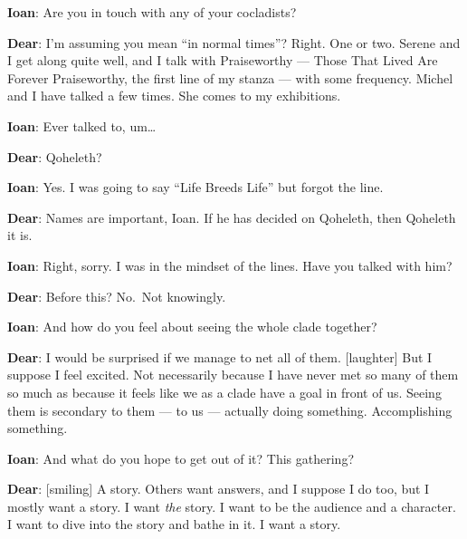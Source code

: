 \textbf{Ioan}: Are you in touch with any of your cocladists?

\textbf{Dear}: I'm assuming you mean ``in normal times''? Right. One or two. Serene and I get along quite well, and I talk with Praiseworthy — Those That Lived Are Forever Praiseworthy, the first line of my stanza — with some frequency. Michel and I have talked a few times. She comes to my exhibitions.

\textbf{Ioan}: Ever talked to, um\ldots{}

\textbf{Dear}: Qoheleth?

\textbf{Ioan}: Yes. I was going to say ``Life Breeds Life'' but forgot the line.

\textbf{Dear}: Names are important, Ioan. If he has decided on Qoheleth, then Qoheleth it is.

\textbf{Ioan}: Right, sorry. I was in the mindset of the lines. Have you talked with him?

\textbf{Dear}: Before this? No.~Not knowingly.

\textbf{Ioan}: And how do you feel about seeing the whole clade together?

\textbf{Dear}: I would be surprised if we manage to net all of them. {[}laughter{]} But I suppose I feel excited. Not necessarily because I have never met so many of them so much as because it feels like we as a clade have a goal in front of us. Seeing them is secondary to them — to us — actually doing something. Accomplishing something.

\textbf{Ioan}: And what do you hope to get out of it? This gathering?

\textbf{Dear}: {[}smiling{]} A story. Others want answers, and I suppose I do too, but I mostly want a story. I want \emph{the} story. I want to be the audience and a character. I want to dive into the story and bathe in it. I want a story.
